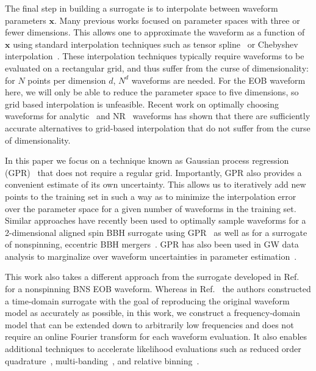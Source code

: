 \documentclass[prd,aps,letter,twocolumn,floatfix,notitlepage,nofootinbib]{revtex4-1}
\def\bx{\mathbf{x}}
\begin{document}
The final step in building a surrogate is to interpolate between waveform parameters $\bx$. Many previous works focused on parameter spaces with three or fewer dimensions. This allows one to approximate the waveform as a function of $\bx$ using standard interpolation techniques such as tensor spline~\cite{Puerrer2014, Puerrer2015} or Chebyshev interpolation~\cite{LackeyBernuzziGalley2017}. These interpolation techniques typically require waveforms to be evaluated on a rectangular grid, and thus suffer from the curse of dimensionality: for $N$ points per dimension $d$,  $N^d$ waveforms are needed. For the EOB waveform here, we will only be able to reduce the parameter space to five dimensions, so grid based interpolation is unfeasible. Recent work on optimally choosing waveforms for analytic~\cite{DoctorFarrHolz2017} and NR~\cite{BlackmanFieldScheel2017a, BlackmanFieldScheel2017b} waveforms has shown that there are sufficiently accurate alternatives to grid-based interpolation that do not suffer from the curse of dimensionality.

In this paper we focus on a technique known as Gaussian process regression (GPR)~\cite{RasmussenWilliams2006} that does not require a regular grid. Importantly, GPR also provides a convenient estimate of its own uncertainty. This allows us to iteratively add new points to the training set in such a way as to minimize the interpolation error over the parameter space for a given number of waveforms in the training set. Similar approaches have recently been used to optimally sample waveforms for a 2-dimensional aligned spin BBH surrogate using GPR~\cite{DoctorFarrHolz2017} as well as for a surrogate of nonspinning, eccentric BBH mergers~\cite{HuertaMooreKumar2017}. GPR has also been used in GW data analysis to marginalize over waveform uncertainties in parameter estimation~\cite{MooreGair2014, MooreBerryChua2016}.

This work also takes a different approach from the surrogate developed in Ref.~\cite{LackeyBernuzziGalley2017} for a nonspinning BNS EOB waveform. Whereas in Ref.~\cite{LackeyBernuzziGalley2017} the authors constructed a time-domain surrogate with the goal of reproducing the original waveform model as accurately as possible, in this work, we construct a frequency-domain model that can be extended down to arbitrarily low frequencies and does not require an online Fourier transform for each waveform evaluation. It also enables additional techniques to accelerate likelihood evaluations such as reduced order quadrature~\cite{Antil2013, CanizaresFieldGair2013, CanizaresFieldGair2015, Smith:2016qas}, multi-banding~\cite{VinciguerraVeitchMandel2017}, and relative binning~\cite{Zackay:2018qdy}.
\end{document}
